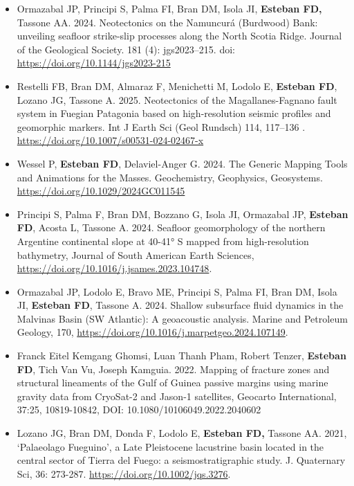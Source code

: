 \documentclass[11pt, a4paper]{article}
\begin{document}
\begin{itemize}
  \item Ormazabal JP, Principi S, Palma FI, Bran DM, Isola JI, \textbf{Esteban FD,} Tassone AA. 2024. Neotectonics on the Namuncurá (Burdwood) Bank: unveiling seafloor strike-slip processes along the North Scotia Ridge. Journal of the Geological Society. 181 (4): jgs2023–215. doi: \url{https://doi.org/10.1144/jgs2023-215}


  \item Restelli FB, Bran DM, Almaraz F, Menichetti M, Lodolo E, \textbf{Esteban FD}, Lozano JG, Tassone A. 2025. Neotectonics of the Magallanes-Fagnano fault system in Fuegian Patagonia based on high-resolution seismic profiles and geomorphic markers. Int J Earth Sci (Geol Rundsch) 114, 117–136 . \url{https://doi.org/10.1007/s00531-024-02467-x}

  \item Wessel P, \textbf{Esteban FD}, Delaviel-Anger G. 2024. The Generic Mapping Tools and Animations for the Masses. Geochemistry, Geophysics, Geosystems. \url{https://doi.org/10.1029/2024GC011545}

  \item Principi S, Palma F, Bran DM, Bozzano G, Isola JI, Ormazabal JP, \textbf{Esteban FD}, Acosta L, Tassone A. 2024. Seafloor geomorphology of the northern Argentine continental slope at 40-41° S mapped from high-resolution bathymetry, Journal of South American Earth Sciences, \url{https://doi.org/10.1016/j.jsames.2023.104748}.

  \item Ormazabal JP, Lodolo E, Bravo ME, Principi S, Palma FI, Bran DM, Isola JI, \textbf{Esteban FD}, Tassone A. 2024. Shallow subsurface fluid dynamics in the Malvinas Basin (SW Atlantic): A geoacoustic analysis. Marine and Petroleum Geology, 170, \url{https://doi.org/10.1016/j.marpetgeo.2024.107149}.

  \item Franck Eitel Kemgang Ghomsi, Luan Thanh Pham, Robert Tenzer, \textbf{Esteban FD}, Tich Van Vu, Joseph Kamguia. 2022. Mapping of fracture zones and structural lineaments of the Gulf of Guinea passive margins using marine gravity data from CryoSat-2 and Jason-1 satellites, Geocarto International, 37:25, 10819-10842, DOI: 10.1080/10106049.2022.2040602

  \item Lozano JG, Bran DM, Donda F, Lodolo E, \textbf{Esteban FD,} Tassone AA. 2021, ‘Palaeolago Fueguino’, a Late Pleistocene lacustrine basin located in the central sector of Tierra del Fuego: a seismostratigraphic study. J. Quaternary Sci, 36: 273-287. \url{https://doi.org/10.1002/jqs.3276}.


\end{itemize}
\end{document}
